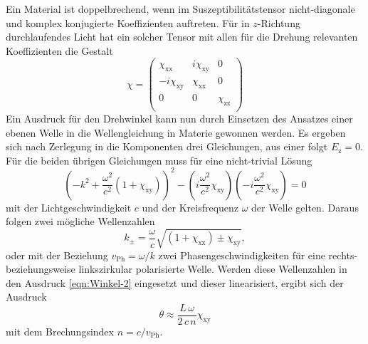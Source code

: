 Ein Material ist doppelbrechend, wenn im Suszeptibilitätstensor
nicht-diagonale und komplex konjugierte Koeffizienten auftreten.
Für in $z$-Richtung durchlaufendes Licht hat ein solcher Tensor
mit allen für die Drehung relevanten Koeffizienten die Gestalt
\begin{equation*}
  \chi =
  \begin{pmatrix}
    \chi_\text{xx} & i \chi_\text{xy} & 0 \\
    -i \chi_\text{xy} & \chi_\text{xx} & 0 \\
    0 & 0 & \chi_\text{zz} \\
  \end{pmatrix}
\end{equation*}
Ein Ausdruck für den Drehwinkel kann nun durch Einsetzen des Ansatzes
einer ebenen Welle in die Wellengleichung in Materie gewonnen werden.
Es ergeben sich nach Zerlegung in die Komponenten drei Gleichungen,
aus einer folgt $E_\text{z} = 0$.
Für die beiden übrigen Gleichungen muss für eine nicht-trivial Lösung
\begin{equation*}
  \left(- k^2 + \frac{\omega^2}{c^2} \left(1 + \chi_\text{xy}\right)\right)^2
  -\left(i \frac{\omega^2}{c^2} \chi_\text{xy}\right)
  \left(- i \frac{\omega^2}{c^2} \chi_\text{xy}\right)
  = 0
\end{equation*}
mit der Lichtgeschwindigkeit $c$ und der Kreisfrequenz $\omega$
der Welle gelten.
Daraus folgen zwei mögliche Wellenzahlen
\begin{equation*}
  k_\pm = \frac{\omega}{c} \sqrt{\left(1 + \chi_\text{xx}\right) \pm \chi_\text{xy}},
\end{equation*}
oder mit der Beziehung $v_\text{Ph} = \omega / k$ zwei Phasengeschwindigkeiten
für eine rechts- beziehungsweise linkszirkular polarisierte Welle.
Werden diese Wellenzahlen in den Ausdruck \eqref{eqn:Winkel-2}
eingesetzt und dieser linearisiert, ergibt sich der Ausdruck
\begin{equation}
  \theta \approx \frac{L \, \omega}{2 \, c \, n} \chi_\text{xy}
  \label{eqn:Winkel-1}
\end{equation}
mit dem Brechungsindex $n = c / v_\text{Ph}$.


